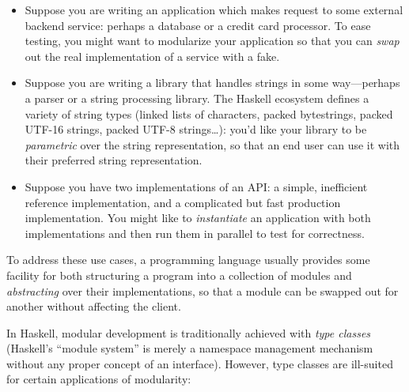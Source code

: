 \begin{itemize}
    \item Suppose you are writing an application which makes request to
    some external backend service: perhaps a database or a credit card
    processor.  To ease testing, you might want to modularize your
    application so that you can \emph{swap} out the real implementation
    of a service with a fake.

    \item Suppose you are writing a library that handles strings in some
    way---perhaps a parser or a string processing library. The Haskell
    ecosystem defines a variety of string types (linked lists of
    characters, packed bytestrings, packed UTF-16 strings, packed UTF-8
    strings\ldots):  you'd like your library to be \emph{parametric}
    over the string representation, so that an end user can use it with their
    preferred string representation.

    \item Suppose you have two implementations of an API\@: a simple,
    inefficient reference implementation, and a complicated but
    fast production implementation.  You might like to \emph{instantiate}
    an application with both implementations and then run them in
    parallel to test for correctness.
\end{itemize}
%
To address these use cases, a programming language usually provides some
facility for both structuring a program into a collection of modules and
\emph{abstracting} over their implementations, so that a module can be
swapped out for another without affecting the client.

In Haskell, modular development is traditionally achieved with
\emph{type classes} (Haskell's ``module system'' is merely
a namespace management mechanism without any proper concept of an
interface).  However, type classes are ill-suited for certain
applications of modularity:

